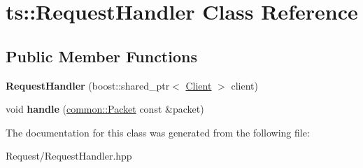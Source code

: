 \hypertarget{classts_1_1_request_handler}{}\section{ts\+:\+:Request\+Handler Class Reference}
\label{classts_1_1_request_handler}
\subsection*{Public Member Functions}
\begin{DoxyCompactItemize}
\item 
\mbox{\label{classts_1_1_request_handler_a535270343f3d8f3b492173bfb0c1cdb7}} 
{\bfseries Request\+Handler} (boost\+::shared\+\_\+ptr$<$ \hyperlink{classts_1_1_client}{Client} $>$ client)
\item 
\mbox{\label{classts_1_1_request_handler_a7a2681538784f6c2ea4844d8979fc624}} 
void {\bfseries handle} (\hyperlink{structts_1_1common_1_1_packet}{common\+::\+Packet} const \&packet)
\end{DoxyCompactItemize}


The documentation for this class was generated from the following file\+:\begin{DoxyCompactItemize}
\item 
Request/Request\+Handler.\+hpp\end{DoxyCompactItemize}
